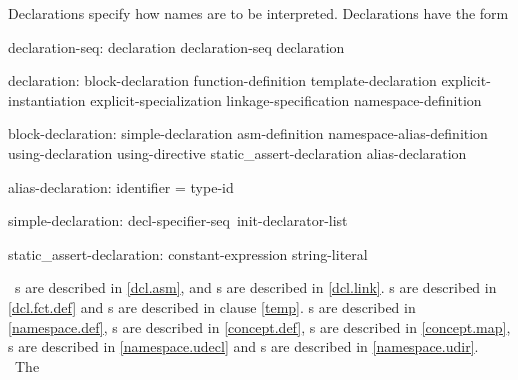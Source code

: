 \documentclass[american]{book}
\begin{document}
\begin{paras}

\pnum
{}%
Declarations specify how names are to be interpreted.
Declarations have the form

\begin{bnf}
%
declaration-seq:\br
        declaration\br
        declaration-seq declaration
\end{bnf}

\begin{bnf}
declaration:\br
        block-declaration\br
        function-definition\br
        template-declaration\br
        explicit-instantiation\br
        explicit-specialization\br
        linkage-specification\br
        namespace-definition\br
        \br
\end{bnf}

\begin{bnf}
block-declaration:\br
        simple-declaration\br
        asm-definition\br
        namespace-alias-definition\br
        using-declaration\br
        using-directive\br
        static_assert-declaration\br
        alias-declaration
\end{bnf}

\begin{bnf}
alias-declaration:\br
         identifier = type-id

simple-declaration:\br
        decl-specifier-seq\opt\ init-declarator-list\opt\ \terminal{;}

%
static_assert-declaration:\br
   \terminal{(} constant-expression \terminal{,} string-literal \terminal{)} \terminal{;}
\end{bnf}

\enternote\ 
s
are described in \ref{dcl.asm}, and
s
are described in \ref{dcl.link}.
s
are described in \ref{dcl.fct.def} and
s
are described in clause \ref{temp}.
s
are described in \ref{namespace.def},
\textcolor{addclr}{s
are described in \ref{concept.def},}
\textcolor{addclr}{s
are described in \ref{concept.map}},
s
are described in \ref{namespace.udecl} and
s
are described in \ref{namespace.udir}.
\exitnote\ 
The
\ 


\end{paras}
\end{document}

